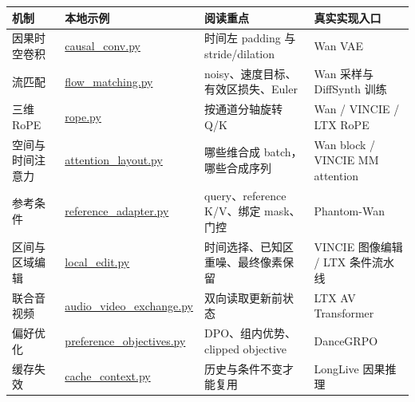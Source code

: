 {\def\LTcaptype{table} %
\small\setlength{\tabcolsep}{3pt}\renewcommand{\arraystretch}{1.18}
\begin{longtable}[]{@{}
  >{\raggedright\arraybackslash}p{}
  >{\raggedright\arraybackslash}p{}
  >{\raggedright\arraybackslash}p{}
  >{\raggedright\arraybackslash}p{}@{}}
\toprule\noalign{}
\begin{minipage}[b]{\linewidth}\raggedright
机制
\end{minipage} & \begin{minipage}[b]{\linewidth}\raggedright
本地示例
\end{minipage} & \begin{minipage}[b]{\linewidth}\raggedright
阅读重点
\end{minipage} & \begin{minipage}[b]{\linewidth}\raggedright
真实实现入口
\end{minipage} \\
\midrule\noalign{}
\endhead
\bottomrule\noalign{}
\endlastfoot
因果时空卷积 & \hyperref[code-causal-conv]{causal\_conv.py} & 时间左 padding 与 stride/dilation & Wan VAE \\
流匹配 & \hyperref[code-flow-matching]{flow\_matching.py} & noisy、速度目标、有效区损失、Euler & Wan 采样与 DiffSynth 训练 \\
三维 RoPE & \hyperref[code-rope]{rope.py} & 按通道分轴旋转 Q/K & Wan / VINCIE / LTX RoPE \\
空间与时间注意力 & \hyperref[code-attention-layout]{attention\_layout.py} & 哪些维合成 batch，哪些合成序列 & Wan block / VINCIE MM attention \\
参考条件 & \hyperref[code-reference-adapter]{reference\_adapter.py} & query、reference K/V、绑定 mask、门控 & Phantom-Wan \\
区间与区域编辑 & \hyperref[code-local-edit]{local\_edit.py} & 时间选择、已知区重噪、最终像素保留 & VINCIE 图像编辑 / LTX 条件流水线 \\
联合音视频 & \hyperref[code-audio-video-exchange]{audio\_video\_exchange.py} & 双向读取更新前状态 & LTX AV Transformer \\
偏好优化 & \hyperref[code-preference-objectives]{preference\_objectives.py} & DPO、组内优势、clipped objective & DanceGRPO \\
缓存失效 & \hyperref[code-cache-context]{cache\_context.py} & 历史与条件不变才能复用 & LongLive 因果推理 \\

\end{longtable}}

